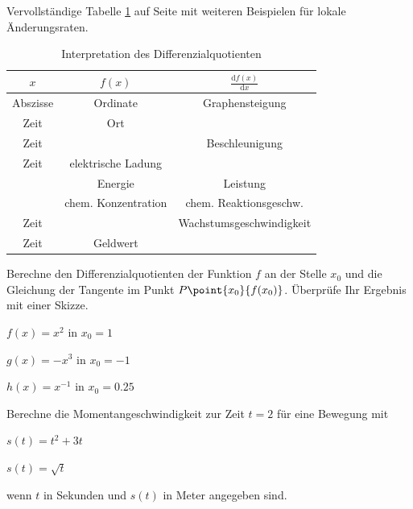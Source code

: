 \documentclass[%
11pt,%
twoside,%
titlepage,%
german,%
headsepline%
]{scrartcl}
\newcommand{\spaltenheight}{\rule{0mm}{3ex}}
\newcommand{\spaltensep}{\\[1ex]}
\begin{document}
\begin{ueb}[\"Anderungsraten]
Vervollst\"andige Tabelle \ref{tab:interpretation} auf Seite \pageref{tab:interpretation} mit weiteren Beispielen f\"ur lokale \"Anderungsraten.

\begin{table}
\large
\begin{center}
\begin{tabular}{|c|c|c|}
\hline
\spaltenheight $x$ & $f(x)$ & $\frac{\mathrm{d}f(x)}{\mathrm{d}x}$ \spaltensep\hline
\spaltenheight Abszisse & Ordinate & Graphensteigung \spaltensep\hline
\spaltenheight Zeit & Ort & \spaltensep\hline
\spaltenheight Zeit & & Beschleunigung \spaltensep\hline
\spaltenheight Zeit & elektrische Ladung & \spaltensep\hline
\spaltenheight  & Energie & Leistung \spaltensep\hline
\spaltenheight  & chem. Konzentration & chem. Reaktionsgeschw.\spaltensep\hline
\spaltenheight  Zeit & & Wachstumsgeschwindigkeit \spaltensep\hline
\spaltenheight  Zeit & Geldwert & \spaltensep\hline
\end{tabular}
\end{center}
\caption{Interpretation des Differenzialquotienten}\label{tab:interpretation}
\end{table}
\end{ueb}

\begin{ueb}[Differenzialquotient]\label{uebtangente}
Berechne
den Differenzialquotienten der Funktion $f$ an der Stelle $x_0$ und die Gleichung der Tangente im Punkt $P\point{x_0}{f(x_0)}$. \"Uberpr\"ufe Ihr Ergebnis mit einer Skizze.
\begin{enumeratea}
\item $f(x)=x^2$ in $x_0=1$
\item $g(x)=-x^3$ in $x_0=-1$
\item $h(x)=x^{-1}$ in $x_0=0.25$
\end{enumeratea}
\end{ueb}

\begin{ueb}[Momentangeschwindigkeit]\label{uebmomentangeschw}
Berechne
die Momentangeschwindigkeit zur Zeit $t=2$ f\"ur eine Bewegung mit

\begin{minipage}{3.5cm}
\begin{enumeratea}
\item $s(t)=t^2+3t$
\end{enumeratea}
\end{minipage}
\begin{minipage}{3.5cm}
\begin{enumeratea}
\addtocounter{enumi}{1}
\item $s(t)=\sqrt{t}$
\end{enumeratea}
\end{minipage}

wenn $t$ in Sekunden und $s(t)$ in Meter angegeben sind.
\end{ueb}
\end{document}
